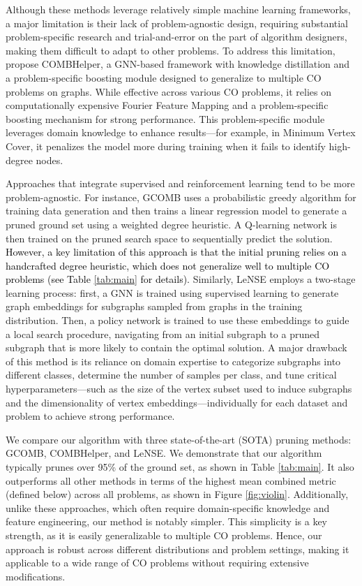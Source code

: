 \documentclass[letterpaper]{article} %
\begin{document}
Although these methods leverage relatively simple machine learning frameworks, a major limitation is their lack of problem-agnostic design, requiring substantial problem-specific research and trial-and-error on the part of algorithm designers, making them difficult to adapt to other problems. To address this limitation, \citet{tian2024combhelper} propose COMBHelper, a GNN-based framework with knowledge distillation and a problem-specific boosting module designed to generalize to multiple CO problems on graphs. While effective across various CO problems, it relies on computationally expensive Fourier Feature Mapping and a problem-specific boosting mechanism for strong performance. This problem-specific module leverages domain knowledge to enhance results—for example, in Minimum Vertex Cover, it penalizes the model more during training when it fails to identify high-degree nodes.


Approaches that integrate supervised and reinforcement learning tend to be more problem-agnostic. For instance, GCOMB \cite{manchanda2020gcomb} uses a probabilistic greedy algorithm for training data generation and then trains a linear regression model to generate a pruned ground set using a weighted degree heuristic. A Q-learning network is then trained on the pruned search space to sequentially predict the solution. \textcolor{black}{However, a key limitation of this approach is that the initial pruning relies on a handcrafted degree heuristic, which does not generalize well to multiple CO problems (see Table \ref{tab:main} for details).} Similarly, LeNSE \citep{ireland2022lense} employs a two-stage learning process: first, a GNN is trained using supervised learning to generate graph embeddings for subgraphs sampled from graphs in the training distribution. Then, a policy network is trained to use these embeddings to guide a local search procedure, navigating from an initial subgraph to a pruned subgraph that is more likely to contain the optimal solution. A major drawback of this method is its reliance on domain expertise to categorize subgraphs into different classes, determine the number of samples per class, and tune critical hyperparameters—such as the size of the vertex subset used to induce subgraphs and the dimensionality of vertex embeddings—individually for each dataset and problem to achieve strong performance.

We compare our algorithm with three state-of-the-art (SOTA) pruning methods: GCOMB, COMBHelper, and LeNSE. We demonstrate that our algorithm typically prunes over 95\% of the ground set, as shown in Table \ref{tab:main}. It also outperforms all other methods in terms of the highest mean combined metric (defined below) across all problems, as shown in Figure \ref{fig:violin}. Additionally, unlike these approaches, which often require domain-specific knowledge and feature engineering, our method is notably simpler. This simplicity is a key strength, as it is easily generalizable to multiple CO problems. Hence, our approach is robust across different distributions and problem settings, making it applicable to a wide range of CO problems without requiring extensive modifications.
\end{document}
